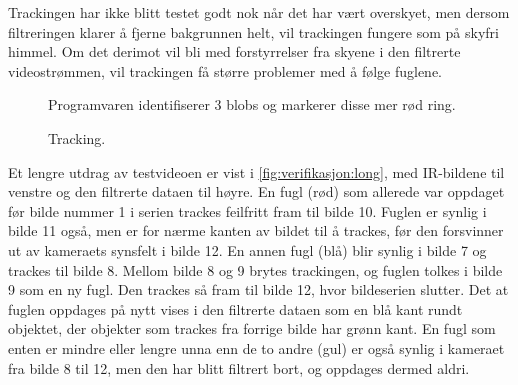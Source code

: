 Trackingen har ikke blitt testet godt nok når det har vært overskyet, men dersom filtreringen klarer å fjerne bakgrunnen helt, vil trackingen fungere som på skyfri himmel. 
Om det derimot vil bli med forstyrrelser fra skyene i den filtrerte videostrømmen, vil trackingen få større problemer med å følge fuglene.


\begin{figure}[H]
    \centering
    \caption{Programvaren identifiserer 3 blobs og markerer disse mer rød ring.}
    \label{fig:verifikasjon:blob:1}
\end{figure}
\begin{figure}[H]
    \centering
    \caption{Tracking.}
    \label{fig:verifikasjon:tracking:1}
\end{figure}

Et lengre utdrag av testvideoen er vist i \autoref{fig:verifikasjon:long}, med IR-bildene til venstre og den filtrerte dataen til høyre. 
En fugl (rød) som allerede var oppdaget før bilde nummer 1 i serien trackes feilfritt fram til bilde 10. 
Fuglen er synlig i bilde 11 også, men er for nærme kanten av bildet til å trackes, før den forsvinner ut av kameraets synsfelt i bilde 12.
En annen fugl (blå) blir synlig i bilde 7 og trackes til bilde 8. Mellom bilde 8 og 9 brytes trackingen, og fuglen tolkes i bilde 9 som en ny fugl. Den trackes så fram til bilde 12, hvor bildeserien slutter. Det at fuglen oppdages på nytt vises i den filtrerte dataen som en blå kant rundt objektet, der objekter som trackes fra forrige bilde har grønn kant.
En fugl som enten er mindre eller lengre unna enn de to andre (gul) er også synlig i kameraet fra bilde 8 til 12, men den har blitt filtrert bort, og oppdages dermed aldri. 

